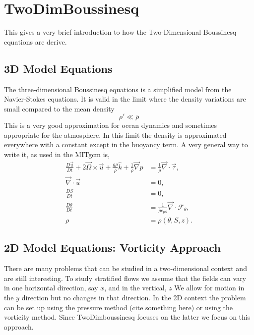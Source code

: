 \documentclass[11pt]{article}
\begin{document}

 



\section*{TwoDimBoussinesq}

This gives a very brief introduction to how the Two-Dimensional Boussinesq equations are derive.

\subsection*{3D Model Equations}

The three-dimensional Boussinesq equations is a simplified model from the Navier-Stokes equations.  It is valid in the limit where the density variations are small compared to the mean density
$$
\rho' \ll \overline{\rho}
$$
This is a very good approximation for ocean dynamics and sometimes appropriate for the atmosphere.  In this limit the density is approximated everywhere with a constant except in the buoyancy term.   A very general way to write it, as used in the MITgcm is,
\begin{align*}
\frac{D\vec u}{Dt} +  2 \vec \Omega \times \vec u 
+ \frac{g \rho}{\overline{\rho}} \hat k + \frac{1}{\overline{\rho}} \vec\nabla p 
& = \frac{1}{\overline{\rho}} \vec\nabla \cdot \vec \tau, \\
 \vec\nabla \cdot \vec u & = 0, \\
\frac{D S}{Dt}  & = 0, \\
\frac{D \theta}{Dt} &= \frac{1}{\overline{\rho} c_{pS}} \vec\nabla \cdot \mathcal{F}_\theta, \\
\rho & = \rho(\theta, S, z).
\end{align*}

\subsection*{2D Model Equations: Vorticity Approach}

There are many problems that can be studied in a two-dimensional context and are still interesting.  To study stratified flows we assume that the fields can vary in one horizontal direction, say $x$, and in the vertical, $z$  We allow for motion in the $y$ direction but no changes in that direction.  In the 2D context the problem can be set up using the pressure method (cite something here) or using the vorticity method.  Since TwoDimboussinesq focuses on the latter we focus on this approach.
\end{document}
